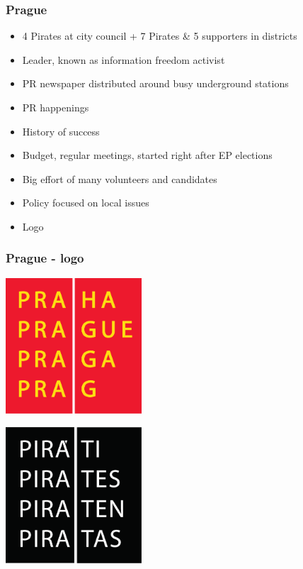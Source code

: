 \begin{frame}
	\frametitle{Prague}
	\begin{itemize}
		\item 4 Pirates at city council + 7 Pirates \& 5 supporters in districts
		\item Leader, known as information freedom activist
		\item PR newspaper distributed around busy underground stations
		\item PR happenings
		\item History of success
		\item Budget, regular meetings, started right after EP elections
		\item Big effort of many volunteers and candidates
		\item Policy focused on local issues
		\item Logo %
	\end{itemize}
\end{frame}
\begin{frame}
	\frametitle{Prague - logo}
	\begin{center}
	\begin{multicols}{2}
		\includegraphics[width = 0.38\textwidth]{Praha.eps}
		
		\includegraphics[width = 0.38\textwidth]{logo_pirati.eps}
	\end{multicols}
	\end{center}
\end{frame}
